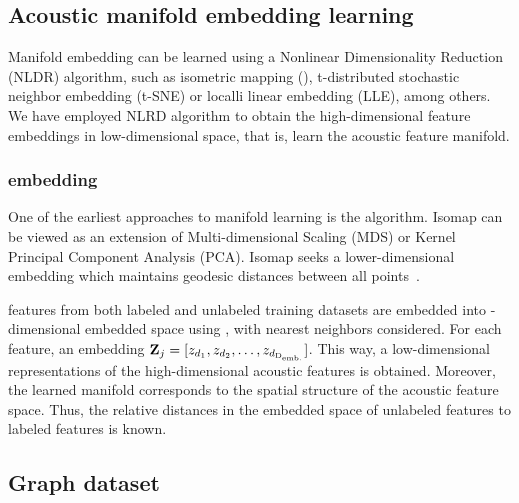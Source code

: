 \documentclass[applsci,article,submit,moreauthors,pdftex]{Definitions/mdpi}
\begin{document}
\subsection{Acoustic manifold embedding learning}

Manifold embedding can be learned using a Nonlinear Dimensionality Reduction (NLDR) algorithm, such as isometric mapping (\isomap{}), t-distributed stochastic neighbor embedding (t-SNE) or localli linear embedding (LLE), among others. 
We have employed \isomap{} NLRD algorithm to obtain the high-dimensional feature embeddings in low-dimensional space, that is, learn the acoustic feature manifold.

\subsubsection{\isomap{} embedding}
One of the earliest approaches to manifold learning is the \isomap{} algorithm. Isomap can be viewed as an extension of Multi-dimensional Scaling (MDS) or Kernel Principal Component Analysis (PCA). Isomap seeks a lower-dimensional embedding which maintains geodesic distances between all points~\cite{pedregosaScikitlearnMachineLearning2011}.

\srpphat{} features from both labeled and unlabeled training datasets are embedded into \Demb-dimensional embedded space using \isomap{}, with \kemb{} nearest neighbors considered. 
For each \SRPfeature{} feature, an embedding $ \mathbf{Z}_{j}{} = [z_{d_1}, z_{d_2}, \dots, z_{d_{\mathrm{D}_{\mathrm{emb.}}}}] $. This way, a low-dimensional representations of the high-dimensional acoustic features is obtained. Moreover, the learned manifold corresponds to the spatial structure of the acoustic feature space. Thus, the relative distances in the embedded space of unlabeled features to labeled features is known. 


\subsection{Graph dataset} \label{subsec:graphdataset}
\end{document}
